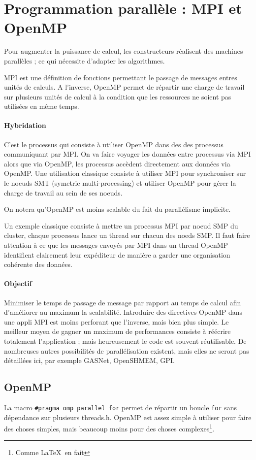 \documentclass{article}
\begin{document}
\section{Programmation parallèle : MPI et OpenMP}
Pour augmenter la puissance de calcul, les constructeurs réalisent des machines parallèles ; ce qui nécessite d'adapter les algorithmes.

MPI est une définition de fonctions permettant le passage de messages entres unités de calculs. A l'inverse, OpenMP permet de répartir une charge de travail sur plusieurs unités de calcul à la condition que les ressources ne soient pas utilisées en même temps.


\paragraph{Hybridation}
C'est le processus qui consiste à utiliser OpenMP dans des des processus communiquant par MPI. On va faire voyager les données entre processus via MPI alors que via OpenMP, les processus accèdent directement aux données via OpenMP. Une utilisation classique consiste à utiliser MPI pour synchroniser sur le noeuds SMT (symetric multi-processing) et utiliser OpenMP pour gérer la charge de travail au sein de ses noeuds.

On notera qu'OpenMP est moins scalable du fait du parallélisme implicite.
\bigskip

Un exemple classique consiste à mettre un processus MPI par noeud SMP du cluster, chaque processus lance un thread sur chacun des noeds SMP. Il faut faire attention à ce que les messages envoyés par MPI dans un thread OpenMP identifient clairement leur expéditeur de manière a garder une organisation cohérente des données.

\paragraph{Objectif} Minimiser le temps de passage de message par rapport au temps de calcul afin d'améliorer au maximum la scalabilité. Introduire des directives OpenMP dans une appli MPI est moins perforant que l'inverse, mais bien plus simple. Le meilleur moyen de gagner un maximum de performances consiste à réécrire totalement l'application ; mais heureusement le code est souvent réutilisable. De nombreuses autres possibilités de parallélisation existent, mais elles ne seront pas détaillées ici, par exemple GASNet, OpenSHMEM, GPI.

\subsection{OpenMP}
La macro \texttt{\#pragma omp parallel for} permet de répartir un boucle \texttt{for} sans dépendance sur plusieurs threads.h. OpenMP est assez simple à utiliser pour faire des choses simples, mais beaucoup moins pour des choses complexes\footnote{Comme \LaTeX \, en fait}.
\end{document}

